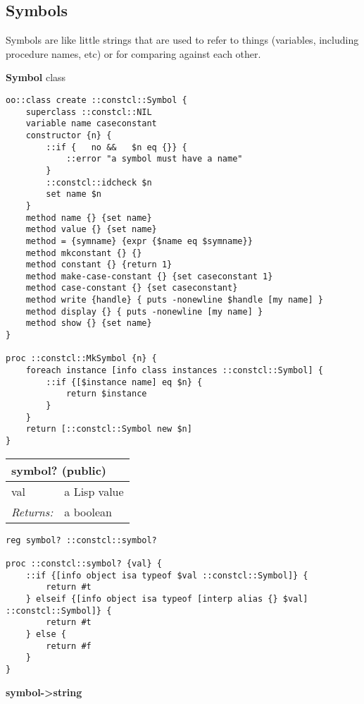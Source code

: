 \documentclass{report}
\begin{document}
\subsection{Symbols}
\label{symbols}

Symbols are like little strings that are used to refer to things (variables, including procedure names, etc) or for comparing against each other.


\textbf{Symbol} class

\noindent\makebox[\linewidth]{\rule{\linewidth}{0.4pt}}
\begin{lstlisting}
oo::class create ::constcl::Symbol {
    superclass ::constcl::NIL
    variable name caseconstant
    constructor {n} {
        ::if {   no &&   $n eq {}} {
            ::error "a symbol must have a name"
        }
        ::constcl::idcheck $n
        set name $n
    }
    method name {} {set name}
    method value {} {set name}
    method = {symname} {expr {$name eq $symname}}
    method mkconstant {} {}
    method constant {} {return 1}
    method make-case-constant {} {set caseconstant 1}
    method case-constant {} {set caseconstant}
    method write {handle} { puts -nonewline $handle [my name] }
    method display {} { puts -nonewline [my name] }
    method show {} {set name}
}
 
proc ::constcl::MkSymbol {n} {
    foreach instance [info class instances ::constcl::Symbol] {
        ::if {[$instance name] eq $n} {
            return $instance
        }
    }
    return [::constcl::Symbol new $n]
}
\end{lstlisting}
\noindent\makebox[\linewidth]{\rule{\linewidth}{0.4pt}}
\begin{tabular}{ |l l| }
\hline
\multicolumn{2}{|l|}{symbol? (public)} \\
\hline
val & a Lisp value \\
\textit{Returns:} & a boolean \\
\hline
\end{tabular}

\noindent\makebox[\linewidth]{\rule{\linewidth}{0.4pt}}
\begin{lstlisting}
reg symbol? ::constcl::symbol?
 
proc ::constcl::symbol? {val} {
    ::if {[info object isa typeof $val ::constcl::Symbol]} {
        return #t
    } elseif {[info object isa typeof [interp alias {} $val] ::constcl::Symbol]} {
        return #t
    } else {
        return #f
    }
}
\end{lstlisting}
\noindent\makebox[\linewidth]{\rule{\linewidth}{0.4pt}}

\textbf{symbol->string}
\end{document}
